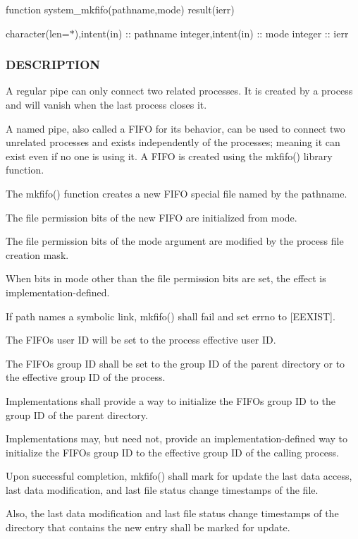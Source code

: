 function system\+\_\+mkfifo(pathname,mode) result(ierr)

character(len=$\ast$),intent(in) \+:\+: pathname integer,intent(in) \+:\+: mode integer \+:\+: ierr

\subsubsection*{D\+E\+S\+C\+R\+I\+P\+T\+I\+ON}

A regular pipe can only connect two related processes. It is created by a process and will vanish when the last process closes it.

A named pipe, also called a F\+I\+FO for its behavior, can be used to connect two unrelated processes and exists independently of the processes; meaning it can exist even if no one is using it. A F\+I\+FO is created using the mkfifo() library function.

The mkfifo() function creates a new F\+I\+FO special file named by the pathname.

The file permission bits of the new F\+I\+FO are initialized from mode.

The file permission bits of the mode argument are modified by the process\textquotesingle{} file creation mask.

When bits in mode other than the file permission bits are set, the effect is implementation-\/defined.

If path names a symbolic link, mkfifo() shall fail and set errno to \mbox{[}E\+E\+X\+I\+ST\mbox{]}.

The F\+I\+FO\textquotesingle{}s user ID will be set to the process\textquotesingle{} effective user ID.

The F\+I\+FO\textquotesingle{}s group ID shall be set to the group ID of the parent directory or to the effective group ID of the process.

Implementations shall provide a way to initialize the F\+I\+FO\textquotesingle{}s group ID to the group ID of the parent directory.

Implementations may, but need not, provide an implementation-\/defined way to initialize the F\+I\+FO\textquotesingle{}s group ID to the effective group ID of the calling process.

Upon successful completion, mkfifo() shall mark for update the last data access, last data modification, and last file status change timestamps of the file.

Also, the last data modification and last file status change timestamps of the directory that contains the new entry shall be marked for update.

